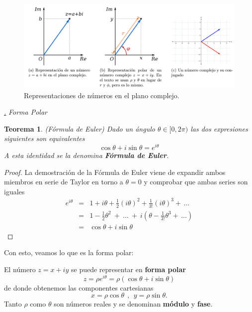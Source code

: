\documentclass[a4paper,11pt]{book} %
\newtheorem{teorema_contador}{Teorema}
\newcommand{\Teorema}[1]{
		\begin{mybox_gray2}{}
			\begin{teorema_contador}
				 #1 
			\end{teorema_contador} 
		\end{mybox_gray2}
	}
\numberwithin{equation}{chapter}
\def\subsubiContadorIt{\par\addtocounter{subsubsection}{1}\underline{\it\thesubsubsection.}\hskip0.5cm \setcounter{subsubsubsectionIt}{0}}
\newcommand{\SubsubiIt}[1]{
		\subsubiContadorIt \textit{#1}
	}
\newcounter{subsubsubsectionIt}[subsubsection]
\begin{document}
	\begin{figure}[H]
	\centering 
	\includegraphics[width=1\linewidth]{Figuras/Fig_subfig_formalismo_nums_en_plano_complejo.png}
	\caption{Representaciones de números en el plano complejo.}
	\label{Fig_formalismo_conjugación}
	\end{figure}

			
			\SubsubiIt{Forma Polar}
			
	\Teorema{ \textit{(Fórmula de Euler)}
	Dado un ángulo $\theta \in [0,2 \pi)$ las dos expresiones siguientes son equivalentes
	\begin{equation}
	\cos \theta + i \sin \theta = e^{i \theta}
	\end{equation}
	A esta identidad se la denomina \textbf{Fórmula de Euler}.
	}
	
	\begin{proof}
	La demostración de la Fórmula de Euler viene de expandir ambos miembros en serie de Taylor en torno a $\theta = 0$ y comprobar que ambas series son iguales
	\begin{equation}
	\begin{array}{rcl}
	e^{i\theta} &=& 1 + i\theta + \frac{1}{2}(i\theta)^2 + \frac{1}{3!}(i\theta)^3+\, ... \\
    &=& 1 -\frac{1}{2}\theta^2 ~+~ ... ~+~ i \left(\theta - \frac{1}{3!} \theta^3+ \, ...\right) \\
    &=& \cos \theta  + i \sin \theta 
	\end{array} 
	\end{equation}
	\end{proof}

Con esto, veamos lo que es la forma polar:
	\begin{mybox_gray2}{}
	El número $z=x + i y$ se puede representar en \textbf{forma polar}
		\begin{equation}  \label{ec_formalismo_forma_polar}
		z = \rho e^{i\theta} = \rho (\cos\theta + i \sin\theta)  
		\end{equation}
	de donde obtenemos las componentes cartesianas 
		\begin{equation}
		x=\rho\cos\theta ~~,~~y=\rho\sin\theta.
		\end{equation}
 	Tanto $\rho$ como $\theta$ son números reales y se denominan \textbf{módulo} y \textbf{fase}.
	\end{mybox_gray2}
	
\end{document}
